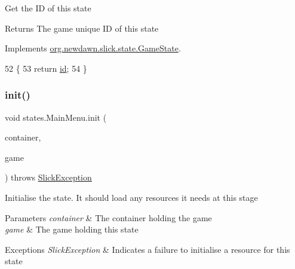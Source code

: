 Get the ID of this state

\begin{DoxyReturn}{Returns}
The game unique ID of this state 
\end{DoxyReturn}


Implements \mbox{\hyperlink{interfaceorg_1_1newdawn_1_1slick_1_1state_1_1_game_state_a54f2bc6a91feaf0614a5ef19f1d03313}{org.\+newdawn.\+slick.\+state.\+Game\+State}}.


\begin{DoxyCode}
52                        \{
53         \textcolor{keywordflow}{return} \mbox{\hyperlink{classstates_1_1_main_menu_acdd02005ac38a76e9d4e5bca1e33fb4c}{id}};
54     \}
\end{DoxyCode}
\mbox{\label{classstates_1_1_main_menu_adbc27fa7433e43c8cbb8bb86db82daa1}} 
\subsubsection{\texorpdfstring{init()}{init()}}
{\footnotesize\ttfamily void states.\+Main\+Menu.\+init (\begin{DoxyParamCaption}\item[{final \mbox{\hyperlink{classorg_1_1newdawn_1_1slick_1_1_game_container}{Game\+Container}}}]{container,  }\item[{final \mbox{\hyperlink{classorg_1_1newdawn_1_1slick_1_1state_1_1_state_based_game}{State\+Based\+Game}}}]{game }\end{DoxyParamCaption}) throws \mbox{\hyperlink{classorg_1_1newdawn_1_1slick_1_1_slick_exception}{Slick\+Exception}}\hspace{0.3cm}{\ttfamily [inline]}}

Initialise the state. It should load any resources it needs at this stage


\begin{DoxyParams}{Parameters}
{\em container} & The container holding the game \\
\hline
{\em game} & The game holding this state \\
\hline
\end{DoxyParams}

\begin{DoxyExceptions}{Exceptions}
{\em Slick\+Exception} & Indicates a failure to initialise a resource for this state \\
\hline
\end{DoxyExceptions}


